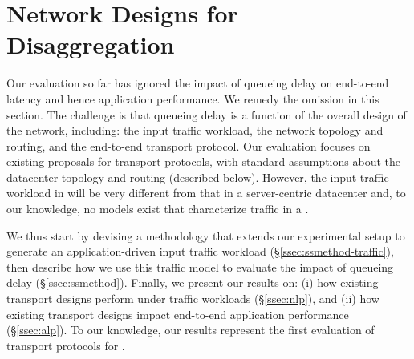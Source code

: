 \section{Network Designs for Disaggregation}
\label{sec:existing}

Our evaluation so far has ignored the impact of queueing delay on end-to-end latency and hence application performance. We remedy the omission in this section.
The challenge is that queueing delay is a function of the overall design of the network, including: the input traffic workload, the network topology and routing, and the end-to-end transport protocol. Our evaluation focuses on existing proposals for transport protocols, with standard assumptions about the datacenter topology and routing (described below). However, the input traffic workload in \dis will be very different from that in a server-centric datacenter and, to our knowledge, no models exist that characterize traffic in a \dis. 

We thus start by devising a methodology that extends our experimental setup to generate an application-driven input traffic workload (\S\ref{ssec:ssmethod-traffic}), then describe how we use this traffic model to evaluate the impact of queueing delay (\S\ref{ssec:ssmethod}). Finally, we present our results on: (i) how existing transport designs perform under \dis traffic workloads (\S\ref{ssec:nlp}), and (ii) how existing transport designs impact end-to-end application performance (\S\ref{ssec:alp}). To our knowledge, our results represent the first evaluation of transport protocols for \dis. %





